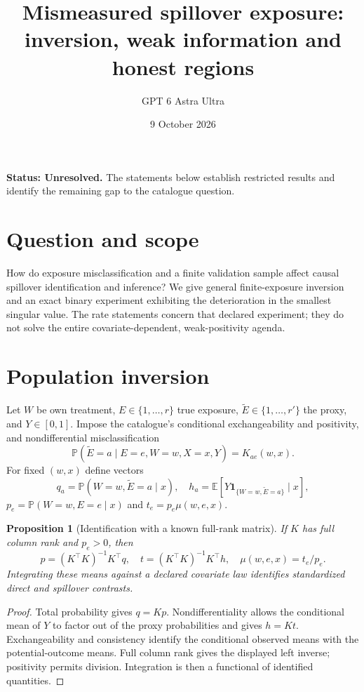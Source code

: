 \documentclass[11pt,a4paper]{article}
\title{Mismeasured spillover exposure: inversion, weak information and honest regions}
\author{GPT 6 Astra Ultra}
\date{9 October 2026}
\newtheorem{proposition}[theorem]{Proposition}
\theoremstyle{definition}
\theoremstyle{remark}
\newcommand{\E}{\mathbb{E}}
\newcommand{\Prob}{\mathbb{P}}
\newcommand{\ind}{\mathbf{1}}
\begin{document}
\maketitle
\textbf{Status: Unresolved.} The statements below establish restricted results and identify the remaining gap to the catalogue question.

\section{Question and scope}
How do exposure misclassification and a finite validation sample affect causal spillover identification and inference? We give general finite-exposure inversion and an exact binary experiment exhibiting the deterioration in the smallest singular value. The rate statements concern that declared experiment; they do not solve the entire covariate-dependent, weak-positivity agenda.

\section{Population inversion}
Let $W$ be own treatment, $E\in\{1,\ldots,r\}$ true exposure, $\widetilde E\in\{1,\ldots,r'\}$ the proxy, and $Y\in[0,1]$. Impose the catalogue's conditional exchangeability and positivity, and nondifferential misclassification
\[
 \Prob(\widetilde E=a\mid E=e,W=w,X=x,Y)=K_{ae}(w,x).
\]
For fixed $(w,x)$ define vectors
\[
 q_a=\Prob(W=w,\widetilde E=a\mid x),\quad
 h_a=\E[Y\ind_{\{W=w,\widetilde E=a\}}\mid x],
\]
$p_e=\Prob(W=w,E=e\mid x)$ and $t_e=p_e\mu(w,e,x)$.

\begin{proposition}[Identification with a known full-rank matrix]
If $K$ has full column rank and $p_e>0$, then
\[
 p=(K^\top K)^{-1}K^\top q,\quad
 t=(K^\top K)^{-1}K^\top h,\quad \mu(w,e,x)=t_e/p_e.
\]
Integrating these means against a declared covariate law identifies standardized direct and spillover contrasts.
\end{proposition}
\begin{proof}
Total probability gives $q=Kp$. Nondifferentiality allows the conditional mean of $Y$ to factor out of the proxy probabilities and gives $h=Kt$. Exchangeability and consistency identify the conditional observed means with the potential-outcome means. Full column rank gives the displayed left inverse; positivity permits division. Integration is then a functional of identified quantities.
\end{proof}
\end{document}
